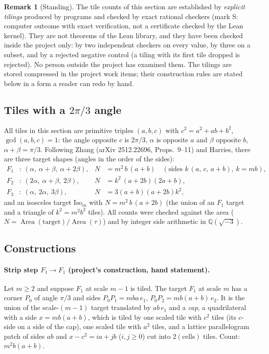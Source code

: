 \documentclass[11pt,reqno]{amsart}
\theoremstyle{plain}
\theoremstyle{definition}
\newtheorem{remark}[theorem]{Remark}
\newcommand{\Q}{\mathbb{Q}}
\DeclareMathOperator{\Area}{Area}
\newcommand{\sS}{\textup{\textsf{S}}}
\begin{document}
\begin{remark}[Standing]\label{rem:til:status}
The tile counts of this section are established by \emph{explicit tilings} produced by programs and checked by
exact rational checkers (mark \sS: computer outcome with exact verification, not a certificate checked by the Lean
kernel). They are not theorems of the Lean library, and they have been checked inside the project only: by two
independent checkers on every value, by three on a subset, and by a rejected negative control (a tiling with its
first tile dropped is rejected). No person outside the project has examined them. The tilings are stored
compressed in the project work items; their construction rules are stated below in a form a reader can redo by hand.
\end{remark}

\subsection{Tiles with a $2\pi/3$ angle}\label{sub:til:tiles}
All tiles in this section are primitive triples $(a,b,c)$ with $c^2=a^2+ab+b^2$, $\gcd(a,b,c)=1$: the angle opposite
$c$ is $2\pi/3$, $\alpha$ is opposite $a$ and $\beta$ opposite $b$, $\alpha+\beta=\pi/3$. Following Zhang
(arXiv 2512.22696, Props.~9--11) and Harries, there are three target shapes (angles in the order of the sides):
\begin{align*}
 F_1&:\ (\alpha,\ \alpha+\beta,\ \alpha+2\beta),& N&=m^2\,b\,(a+b)\quad(\text{sides }k\,(a,\,c,\,a+b),\ k=mb),\\
 F_2&:\ (2\alpha,\ \alpha+\beta,\ 2\beta),& N&=k^2\,(a+2b)(2a+b),\\
 F_3&:\ (\alpha,\ 2\alpha,\ 3\beta),& N&=3(a+b)(a+2b)k^2,
\end{align*}
and an isosceles target $\mathrm{Iso}_m$ with $N=m^2\,b\,(a+2b)$ (the union of an $F_1$ target and a triangle of
$k^2=m^2b^2$ tiles). All counts were checked against the area ($N=\Area(\text{target})/\Area(\tau)$) and by
integer side arithmetic in $\Q(\sqrt{-3})$.

\subsection{Constructions}\label{sub:til:constr}
\paragraph{Strip step $F_1\to F_1$ (project's construction, hand statement).} Let $m\ge2$ and suppose $F_1$ at
scale $m-1$ is tiled. The target $F_1$ at scale $m$ has a corner $P_0$ of angle $\pi/3$ and sides
$P_0P_1=mba\,e_1$, $P_0P_2=mb(a+b)\,e_2$. It is the union of the scale-$(m-1)$ target translated by $ab\,e_1$ and a
\emph{cap}, a quadrilateral with a side $x=mb(a+b)$, which is tiled by one scaled tile with $c^2$ tiles (its
$c$-side on a side of the cap), one scaled tile with $a^2$ tiles, and a lattice parallelogram patch of sides $ab$ and
$x-c^2=ia+jb$ ($i,j\ge0$) cut into $2(\text{cells})$ tiles. Count: $m^2b(a+b)$.
\end{document}
